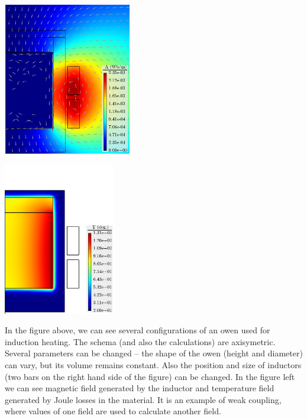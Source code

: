 \documentclass[portrait, a1paper, fontscale=0.5]{baposter}
\begin{document}
\begin{poster}
{\begin{center}
	\begin{minipage}{15em}
		\centering
		\includegraphics[height=18em]{optimization/magnetic_field.png}
	\end{minipage}
	\begin{minipage}{15em}
		\centering
		\includegraphics[height=18em]{optimization/temperature_field.png}
	\end{minipage}
	\begin{minipage}{18em}
		In the figure above, we can see several configurations of an owen used for induction heating. The schema (and also the calculations) are axisymetric.
Several parameters can be changed -- the shape of the owen (height and diameter) can vary, but its volume remains constant. Also the position and size of inductors (two bars on the right hand side of the figure) can be changed. In the figure left we can  see magnetic field generated by the inductor and temperature field generated by Joule losses in the material. It is an example of weak coupling, where values of one field are used to calculate another field.
	\end{minipage}
\end{center}

}
\end{poster}
\end{document}
